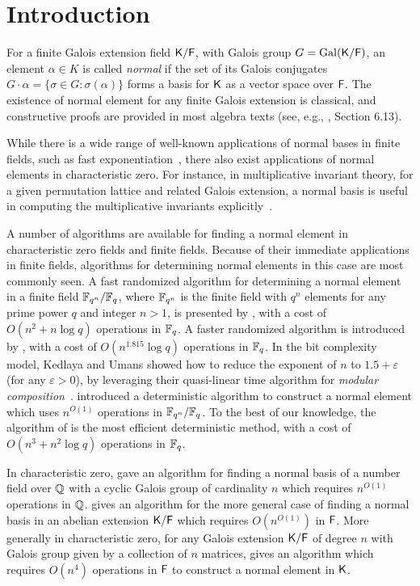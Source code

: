 \section{Introduction}

For a finite Galois extension field ${\mathsf{K}}/{\mathsf{F}}$, with Galois group $G =
\mathrm{Gal}({\mathsf{K}}/{\mathsf{F}})$, an element $\alpha \in K$ is called
\emph{normal} if the set of its Galois conjugates $G \cdot \alpha =
\{\sigma\in G: \sigma(\alpha)\}$ forms a basis for ${\mathsf{K}}$ as a vector space over
${\mathsf{F}}$. The existence of normal element for any finite Galois extension
is classical, and constructive proofs are provided in most algebra texts
(see, e.g., \cite{Lang}, Section 6.13).
 
While there is a wide range of well-known applications of normal bases in
finite fields, such as fast exponentiation~\cite{GaGaPaSh00}, there also
exist applications of normal elements in characteristic zero.  For instance,
in multiplicative invariant theory, for a given permutation lattice and
related Galois extension, a normal basis is useful in computing the
multiplicative invariants explicitly~\cite{Armin}.

A number of algorithms are available for finding a normal element in
characteristic zero fields and finite fields.  Because of their immediate
applications in finite fields, algorithms for determining normal elements
in this case are most commonly seen.  A fast randomized algorithm for
determining a normal element in a finite field $\mathbb{F}_{q^n}/\mathbb{F}_q$, where
$\mathbb{F}_{q^n}$ is the finite field with $q^n$ elements for any prime power $q$
and integer $n>1$, is presented by , with a cost of
$O(n^2+n\log q)$ operations in $\mathbb{F}_q$.  A faster randomized algorithm is
introduced by , with a cost of $O(n^{1.815}\log q)$
operations in $\mathbb{F}_q$.  In the bit complexity model, Kedlaya and Umans showed
how to reduce the exponent of $n$ to $1.5+\varepsilon$ (for any
$\varepsilon > 0$), by leveraging their quasi-linear time algorithm for
{\em modular composition}~\cite{KeUm11}.  introduced a
deterministic algorithm to construct a normal element which uses $n^{O(1)}$
operations in $\mathbb{F}_{q^n}/\mathbb{F}_q$.  To the best of our knowledge, the
algorithm of  is the most efficient deterministic method,
with a cost of $O(n^3+n^2\log q)$ operations in $\mathbb{F}_q$.

In characteristic zero,  gave an algorithm for finding
a normal basis of a number field over $\mathbb{Q}$ with a cyclic Galois group
of cardinality $n$ which requires $n^{O(1)}$ operations in $\mathbb{Q}$.
 gives an algorithm for the more general case of finding
a normal basis in an abelian extension ${\mathsf{K}}/{\mathsf{F}}$ which requires
$O(n^{O(1)})$ in ${\mathsf{F}}$.  More generally in characteristic zero, for any
Galois extension ${\mathsf{K}}/{\mathsf{F}}$ of degree $n$ with Galois group given by a
collection of $n$ matrices,  gives an algorithm which
requires $O(n^4)$ operations in ${\mathsf{F}}$ to construct a normal element in
${\mathsf{K}}$.

